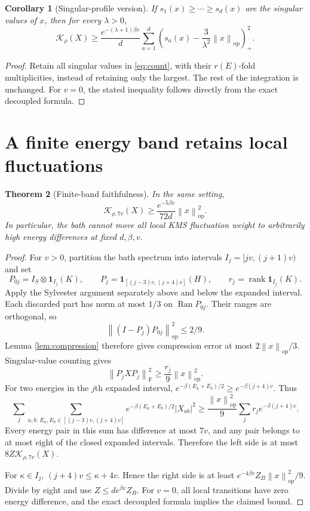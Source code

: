 \documentclass[11pt]{article}
\newtheorem{theorem}{Theorem}[section]
\newtheorem{corollary}[theorem]{Corollary}
\theoremstyle{remark}\newtheorem{remark}[theorem]{Remark}
\newcommand{\op}{\mathrm{op}}
\newcommand{\HS}{\mathrm{F}}
\newcommand{\rank}{\operatorname{rank}}
\newcommand{\id}{\mathbf 1}
\newcommand{\norm}[1]{\left\lVert #1\right\rVert}
\newcommand{\abs}[1]{\left\lvert #1\right\rvert}
\begin{document}
\begin{corollary}[Singular-profile version]\label{cor:profile}
If $s_1(x)\geq\cdots\geq s_d(x)$ are the singular values of $x$, then for every $\lambda>0$,
\begin{equation}
 \mathcal K_\rho(X)\geq
 \frac{e^{-(\lambda+1)\beta v}}{d}
 \sum_{a=1}^d\left(s_a(x)-\frac{3}{\lambda^2}\norm x_\op\right)_+^2.
\end{equation}
\end{corollary}
\begin{proof}
Retain all singular values in \eqref{eq:count}, with their $r(E)$-fold multiplicities, instead of retaining only the largest. The rest of the integration is unchanged. For $v=0$, the stated inequality follows directly from the exact decoupled formula.
\end{proof}

\section{A finite energy band retains local fluctuations}
\begin{theorem}[Finite-band faithfulness]\label{thm:band}
In the same setting,
\begin{equation}\label{eq:band}
 \boxed{\mathcal K_{\rho,7v}(X)\geq
 \frac{e^{-5\beta v}}{72d}\norm x_\op^2.}
\end{equation}
In particular, the bath cannot move all local KMS fluctuation weight to arbitrarily high energy differences at fixed $d,\beta,v$.
\end{theorem}
\begin{proof}
For $v>0$, partition the bath spectrum into intervals $I_j=[jv,(j+1)v)$ and set
\[
 P_{0j}=I_S\otimes\id_{I_j}(K),\qquad
 P_j=\id_{[(j-3)v,(j+4)v]}(H),\qquad
 r_j=\rank\id_{I_j}(K).
\]
Apply the Sylvester argument separately above and below the expanded interval. Each discarded part has norm at most $1/3$ on $\operatorname{Ran}P_{0j}$. Their ranges are orthogonal, so
\[
 \norm{(I-P_j)P_{0j}}_\op^2\leq2/9.
\]
Lemma \ref{lem:compression} therefore gives compression error at most $2\norm x_\op/3$. Singular-value counting gives
\[
 \norm{P_jXP_j}_\HS^2\geq \frac{r_j}{9}\norm x_\op^2.
\]
For two energies in the $j$th expanded interval,
$e^{-\beta(E_a+E_b)/2}\geq e^{-\beta(j+4)v}$. Thus
\[
 \sum_j\sum_{a,b:\,E_a,E_b\in[(j-3)v,(j+4)v]}
 e^{-\beta(E_a+E_b)/2}\abs{X_{ab}}^2
 \geq\frac{\norm x_\op^2}{9}\sum_jr_j e^{-\beta(j+4)v}.
\]
Every energy pair in this sum has difference at most $7v$, and any pair belongs to at most eight of the closed expanded intervals. Therefore the left side is at most $8Z\mathcal K_{\rho,7v}(X)$.

For $\kappa\in I_j$, $(j+4)v\leq\kappa+4v$. Hence the right side is at least
$e^{-4\beta v}Z_B\norm x_\op^2/9$. Divide by eight and use
$Z\leq d e^{\beta v}Z_B$. For $v=0$, all local transitions have zero energy difference, and the exact decoupled formula implies the claimed bound.
\end{proof}
\end{document}
